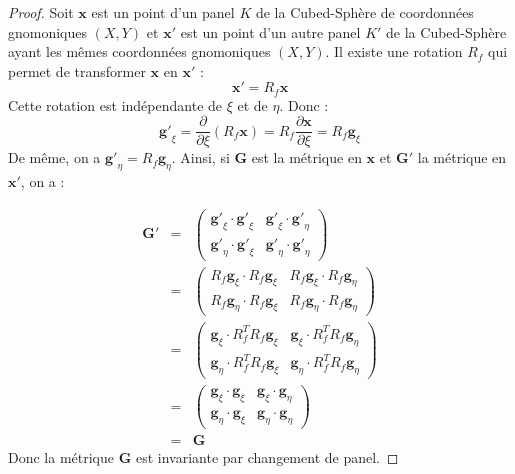 \begin{proof}
Soit $\mathbf{x}$ est un point d'un panel $K$ de la Cubed-Sphère de coordonnées gnomoniques $(X,Y)$ et $\mathbf{x}'$ est un point d'un autre panel $K'$ de la Cubed-Sphère ayant les mêmes coordonnées gnomoniques $(X,Y)$. Il existe une rotation $R_f$ qui permet de transformer $\mathbf{x}$ en $\mathbf{x}'$ :
\begin{equation}
\mathbf{x}' = R_f \mathbf{x}
\end{equation}
Cette rotation est indépendante de $\xi$ et de $\eta$. Donc :
\begin{equation}
\mathbf{g'}_{\xi} = \dfrac{\partial}{\partial \xi} \left( R_f \mathbf{x} \right) = R_f \dfrac{\partial \mathbf{x}}{\partial \xi}  = R_f \mathbf{g}_{\xi}
\end{equation}
De même, on a $\mathbf{g'}_{\eta} = R_f\mathbf{g}_{\eta}$.
Ainsi, si $\mathbf{G}$ est la métrique en $\mathbf{x}$ et $\mathbf{G}'$ la métrique en $\mathbf{x}'$, on a :

\begin{equation*}
\begin{array}{rcl}
\mathbf{G}' &=& \begin{pmatrix}
\mathbf{g'}_{\xi} \cdot \mathbf{g'}_{\xi} & \mathbf{g'}_{\xi} \cdot \mathbf{g'}_{\eta} \\
\mathbf{g'}_{\eta} \cdot \mathbf{g'}_{\xi} & \mathbf{g'}_{\eta} \cdot \mathbf{g'}_{\eta}
\end{pmatrix}\\
&=&
\begin{pmatrix}
R_f \mathbf{g}_{\xi} \cdot R_f \mathbf{g}_{\xi} & R_f \mathbf{g}_{\xi} \cdot R_f \mathbf{g}_{\eta} \\
R_f \mathbf{g}_{\eta} \cdot R_f \mathbf{g}_{\xi} & R_f \mathbf{g}_{\eta} \cdot R_f \mathbf{g}_{\eta}
\end{pmatrix}\\
&=&
\begin{pmatrix}
\mathbf{g}_{\xi} \cdot R_f^{T} R_f \mathbf{g}_{\xi} & \mathbf{g}_{\xi} \cdot  R_f^{T} R_f \mathbf{g}_{\eta} \\
\mathbf{g}_{\eta} \cdot  R_f^{T} R_f \mathbf{g}_{\xi} & \mathbf{g}_{\eta} \cdot  R_f^{T} R_f \mathbf{g}_{\eta}
\end{pmatrix}\\
&=& \begin{pmatrix}
\mathbf{g}_{\xi} \cdot \mathbf{g}_{\xi} & \mathbf{g}_{\xi} \cdot \mathbf{g}_{\eta} \\
\mathbf{g}_{\eta} \cdot \mathbf{g}_{\xi} & \mathbf{g}_{\eta} \cdot \mathbf{g}_{\eta}
\end{pmatrix}\\
& = & \mathbf{G}
\end{array}
\end{equation*}
Donc la métrique $\mathbf{G}$ est invariante par changement de panel.
\end{proof}

